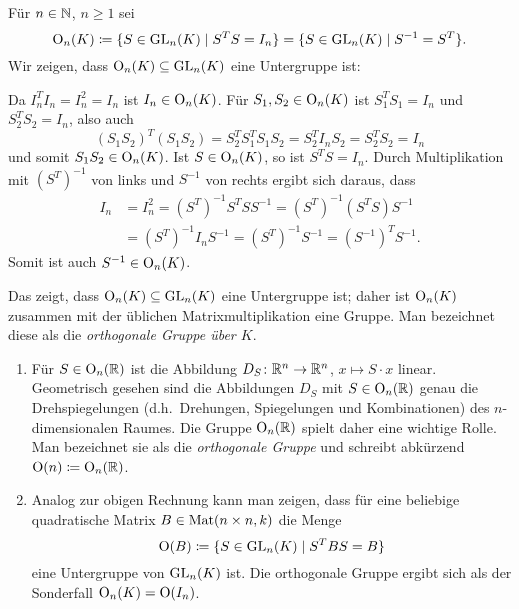 Für $n \in \mathbb{N}$, $n \geq 1$ sei
\[
 \mathrm{O}_n(K)
 \coloneqq \{S \in \mathrm{GL}_n(K) \mid S^T S = I_n\}
 = \{S \in \mathrm{GL}_n(K) \mid S^{-1} = S^T\}.
\]
Wir zeigen, dass $\mathrm{O}_n(K) \subseteq \mathrm{GL}_n(K)$ eine Untergruppe ist:

Da $I_n^T I_n = I_n^2 = I_n$ ist $I_n \in \mathrm{O}_n(K)$. Für $S_1, S_2 \in \mathrm{O}_n(K)$ ist $S_1^T S_1 = I_n$ und $S_2^T S_2 = I_n$, also auch
\[
 (S_1 S_2)^T (S_1 S_2)
 = S_2^T S_1^T S_1 S_2
 = S_2^T I_n S_2
 = S_2^T S_2
 = I_n
\]
und somit $S_1 S_2 \in \mathrm{O}_n(K)$. Ist $S \in \mathrm{O}_n(K)$, so ist $S^T S = I_n$. Durch Multiplikation mit $(S^T)^{-1}$ von links und $S^{-1}$ von rechts ergibt sich daraus, dass
\begin{align*}
 I_n
 &= I_n^2
 = (S^T)^{-1} S^T S S^{-1}
 = (S^T)^{-1} (S^T S) S^{-1} \\
 &= (S^T)^{-1} I_n S^{-1}
 = (S^T)^{-1} S^{-1}
 = (S^{-1})^T S^{-1}.
\end{align*}
Somit ist auch $S^{-1} \in \mathrm{O}_n(K)$.

Das zeigt, dass $\mathrm{O}_n(K) \subseteq \mathrm{GL}_n(K)$ eine Untergruppe ist; daher ist $\mathrm{O}_n(K)$ zusammen mit der üblichen Matrixmultiplikation eine Gruppe. Man bezeichnet diese als die \emph{orthogonale Gruppe über $K$}.

\begin{bem}
 \begin{enumerate}[leftmargin=*]
  \item
   Für $S \in \mathrm{O}_n(\mathbb{R})$ ist die Abbildung $D_S \colon \mathbb{R}^n \to \mathbb{R}^n$, $x \mapsto S \cdot x$ linear. Geometrisch gesehen sind die Abbildungen $D_S$ mit $S \in \mathrm{O}_n(\mathbb{R})$ genau die Drehspiegelungen (d.h.\ Drehungen, Spiegelungen und Kombinationen) des $n$-dimensionalen Raumes. Die Gruppe $\mathrm{O}_n(\mathbb{R})$ spielt daher eine wichtige Rolle. Man bezeichnet sie als die \emph{orthogonale Gruppe} und schreibt abkürzend $\mathrm{O}(n) \coloneqq \mathrm{O}_n(\mathbb{R})$.
  \item
   Analog zur obigen Rechnung kann man zeigen, dass für eine beliebige quadratische Matrix $B \in \mathrm{Mat}(n \times n, k)$ die Menge
   \[
    \mathrm{O}(B) \coloneqq \{S \in \mathrm{GL}_n(K) \mid S^T B S = B\}
   \]
   eine Untergruppe von $\mathrm{GL}_n(K)$ ist. Die orthogonale Gruppe ergibt sich als der Sonderfall $\mathrm{O}_n(K) = \mathrm{O}(I_n)$.
 \end{enumerate}
\end{bem}




